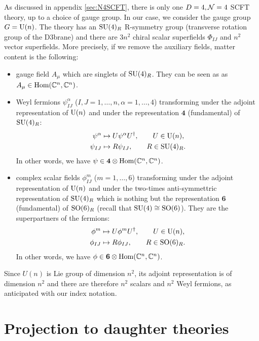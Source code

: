 \documentclass[a4paper,11pt]{article}
\begin{document}
        As discussed in appendix \ref{sec:N4SCFT}, there is only one $D=4,\mathcal{N}=4$ SCFT theory, up to a choice of gauge group. In our case, we consider the gauge group $G=\text{U}(n)$. The theory has an $\text{SU}(4)_R$ R-symmetry group (transverse rotation group of the D$3$brane) and there are $3n^2$ chiral scalar superfields $\Phi_{IJ}$ and $n^2$ vector superfields. More precisely, if we remove the auxiliary fields, matter content is the following:
        \begin{itemize}
            \item gauge field $A_\mu$ which are singlets of $\text{SU}(4)_R$. They can be seen as as $A_\mu\in\text{Hom}(\mathbb{C}^n,\mathbb{C}^n)$.
            \item Weyl fermions $\psi^{\alpha}_{IJ}$ ($I,J=1,\dots,n,\alpha=1,\dots,4$) transforming under the adjoint representation of $\text{U}(n)$ and under the representation $\boldsymbol{4}$ (fundamental) of $\text{SU}(4)_R$:
            \begin{align}
                \psi^\alpha & \mapsto U \psi^\alpha U^\dagger ,\qquad U\in\text{U}(n),\\
                \psi_{IJ} & \mapsto R\psi_{IJ},\qquad R\in\text{SU}(4)_R.
            \end{align}
            In other words, we have $\psi\in\boldsymbol{4}\otimes\text{Hom}(\mathbb{C}^n,\mathbb{C}^n)$.
            \item complex scalar fields $\phi^{m}_{IJ}$ ($m=1,\dots,6$) transforming under the adjoint representation of $\text{U}(n)$ and under the two-times anti-symmettric representation of $\text{SU}(4)_R$ which is nothing but the representation $\boldsymbol{6}$ (fundamental) of $\text{SO}(6)_R$ (recall that $\text{SU}(4)\cong\text{SO}(6)$). They are the superpartners of the fermions:
            \begin{align}
                \phi^m & \mapsto U \phi^m U^\dagger ,\qquad U\in\text{U}(n),\\
                \phi_{IJ} & \mapsto R\phi_{IJ},\qquad R\in\text{SO}(6)_R.
            \end{align}
            In other words, we have $\phi\in\boldsymbol{6}\otimes\text{Hom}(\mathbb{C}^n,\mathbb{C}^n)$.
        \end{itemize}
        Since $U(n)$ is Lie group of dimension $n^2$, its adjoint representation is of dimension $n^2$ and there are therefore $n^2$ scalars and $n^2$ Weyl fermions, as anticipated with our index notation.




\section{Projection to daughter theories}
\end{document}
